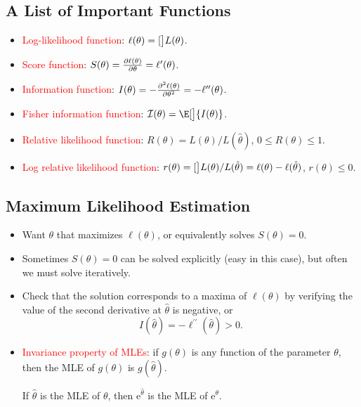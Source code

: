 \documentclass[oneside]{book}\usepackage[]{graphicx}\usepackage[svgnames]{xcolor}
\let\log\relax%
\begin{document}
\subsection*{A List of Important Functions}
\begin{itemize}
      \item \textcolor{Red}{Log-likelihood function}: $ \ell(\theta)=\log[\big]{L(\theta)} $.
      \item \textcolor{Red}{Score function}: $ S(\theta)=\pdv{\ell(\theta)}{\theta}=\ell^\prime(\theta)$.
      \item \textcolor{Red}{Information function}: $ I(\theta)=-\pdv[order=2]{\ell(\theta)}{\theta}=-\ell^{\prime\prime}(\theta) $.
      \item \textcolor{Red}{Fisher information function}: $ \mathcal{I}(\theta)=\E[\big]{I(\theta)} $.
      \item \textcolor{Red}{Relative likelihood function}: $ R(\theta)=L(\theta)/L(\hat{\theta}) $, $ 0\le R(\theta)\le 1 $.
      \item \textcolor{Red}{Log relative likelihood function}: $ r(\theta)=\log[\big]{L(\theta)/L(\hat{\theta})}=\ell(\theta)-\ell(\hat{\theta}) $, $ r(\theta)\le 0 $.
\end{itemize}
\subsection*{Maximum Likelihood Estimation}
\begin{itemize}
      \item Want $ \theta $ that maximizes $ \ell(\theta) $, or equivalently solves $ S(\theta)=0 $.
      \item Sometimes $ S(\theta)=0 $ can be solved explicitly (easy in this case), but often we must solve iteratively.
      \item Check that the solution corresponds to a maxima of $ \ell(\theta) $ by verifying the value of the second derivative at $ \hat{\theta} $ is negative, or
            \[ I(\hat{\theta})=-\ell^{\prime\prime}(\hat{\theta})>0. \]
      \item \textcolor{Red}{Invariance property of MLEs}: if $ g(\theta) $ is any function of the parameter $ \theta $, then the MLE of $ g(\theta) $ is $ g(\hat{\theta}) $.
            \begin{Example}{}
                  If $ \hat{\theta} $ is the MLE of $ \theta $, then $ \mathrm{e}^{\hat{\theta}} $ is the MLE of $ \mathrm{e}^{\theta} $.
            \end{Example}
\end{itemize}
\end{document}

